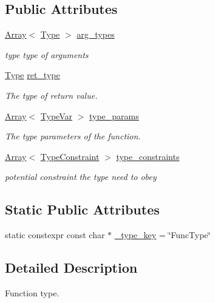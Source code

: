 \subsection*{Public Attributes}
\begin{DoxyCompactItemize}
\item 
\hyperlink{classtvm_1_1Array}{Array}$<$ \hyperlink{classtvm_1_1Type}{Type} $>$ \hyperlink{classtvm_1_1FuncTypeNode_abffc654ce18e472ce19725dbaf5c7316}{arg\+\_\+types}
\begin{DoxyCompactList}\small\item\em type type of arguments \end{DoxyCompactList}\item 
\hyperlink{classtvm_1_1Type}{Type} \hyperlink{classtvm_1_1FuncTypeNode_a4d30bd05ee4751f963daf10f0c69036d}{ret\+\_\+type}
\begin{DoxyCompactList}\small\item\em The type of return value. \end{DoxyCompactList}\item 
\hyperlink{classtvm_1_1Array}{Array}$<$ \hyperlink{classtvm_1_1TypeVar}{Type\+Var} $>$ \hyperlink{classtvm_1_1FuncTypeNode_acc1bb373c5851f6cec016a874f304d05}{type\+\_\+params}
\begin{DoxyCompactList}\small\item\em The type parameters of the function. \end{DoxyCompactList}\item 
\hyperlink{classtvm_1_1Array}{Array}$<$ \hyperlink{classtvm_1_1TypeConstraint}{Type\+Constraint} $>$ \hyperlink{classtvm_1_1FuncTypeNode_a6dd6e8ed07019caa87943ec47d065499}{type\+\_\+constraints}
\begin{DoxyCompactList}\small\item\em potential constraint the type need to obey \end{DoxyCompactList}\end{DoxyCompactItemize}
\subsection*{Static Public Attributes}
\begin{DoxyCompactItemize}
\item 
static constexpr const char $\ast$ \hyperlink{classtvm_1_1FuncTypeNode_a1c1454430a69a07b9f32ca06db81f29e}{\+\_\+type\+\_\+key} = \char`\"{}Func\+Type\char`\"{}
\end{DoxyCompactItemize}


\subsection{Detailed Description}
Function type. 

